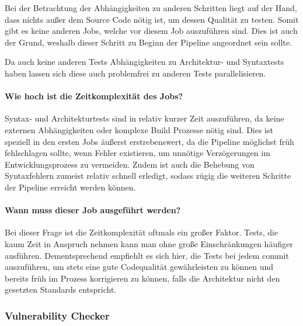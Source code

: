 Bei der Betrachtung der Abhängigkeiten zu anderen Schritten liegt auf der Hand, dass nichts außer dem Source Code nötig ist, um dessen Qualität zu testen.
Somit gibt es keine anderen Jobs, welche vor diesem Job auszuführen sind.
Dies ist auch der Grund, weshalb dieser Schritt zu Beginn der Pipeline angeordnet sein sollte.

Da auch keine anderen Tests Abhängigkeiten zu Architektur- und Syntaxtests haben lassen sich diese auch problemfrei zu anderen Tests parallelisieren.

\paragraph{Wie hoch ist die Zeitkomplexität des Jobs?}

Syntax- und Architekturtests sind in relativ kurzer Zeit auszuführen, da keine externen Abhängigkeiten oder komplexe Build Prozesse nötig sind.
Dies ist speziell in den ersten Jobs äußerst erstrebenswert, da die Pipeline möglichst früh fehlschlagen sollte, wenn Fehler existieren, um unnötige Verzögerungen im Entwicklungsprozess zu vermeiden.
Zudem ist auch die Behebung von Syntaxfehlern zumeist relativ schnell erledigt, sodass zügig die weiteren Schritte der Pipeline erreicht werden können.

\paragraph{Wann muss dieser Job ausgeführt werden?}

Bei dieser Frage ist die Zeitkomplexität oftmals ein großer Faktor.
Tests, die kaum Zeit in Anspruch nehmen kann man ohne große Einschränkungen häufiger ausführen.
Dementsprechend empfiehlt es sich hier, die Tests bei jedem commit auszuführen, um stets eine gute Codequalität gewährleisten zu können und bereits früh im Prozess korrigieren zu können, falls die Architektur nicht den gesetzten Standards entspricht.

\subsubsection{Vulnerability Checker}\label{subsubsec:vulChecker}

